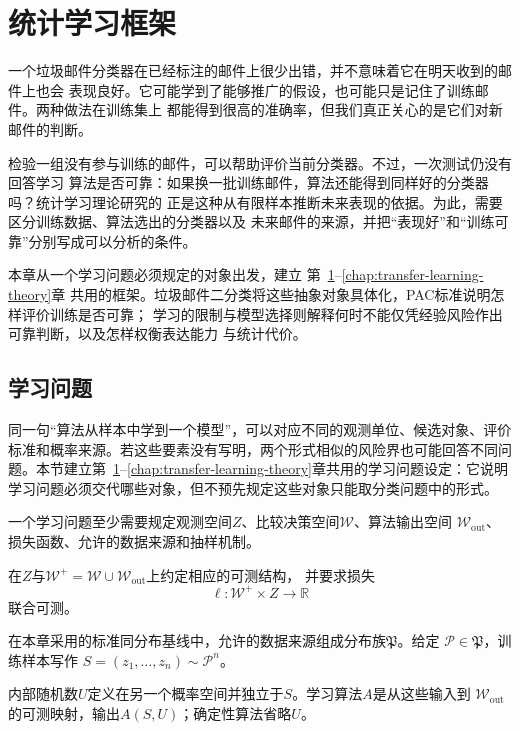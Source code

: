 \chapter{统计学习框架}
\label{chap:statistical-learning-framework}

一个垃圾邮件分类器在已经标注的邮件上很少出错，并不意味着它在明天收到的邮件上也会
表现良好。它可能学到了能够推广的假设，也可能只是记住了训练邮件。两种做法在训练集上
都能得到很高的准确率，但我们真正关心的是它们对新邮件的判断。

检验一组没有参与训练的邮件，可以帮助评价当前分类器。不过，一次测试仍没有回答学习
算法是否可靠：如果换一批训练邮件，算法还能得到同样好的分类器吗？统计学习理论研究的
正是这种从有限样本推断未来表现的依据。为此，需要区分训练数据、算法选出的分类器以及
未来邮件的来源，并把“表现好”和“训练可靠”分别写成可以分析的条件。

本章从一个学习问题必须规定的对象出发，建立
第~\ref{chap:statistical-learning-framework}--\ref{chap:transfer-learning-theory}章
共用的框架。垃圾邮件二分类将这些抽象对象具体化，PAC标准说明怎样评价训练是否可靠；
学习的限制与模型选择则解释何时不能仅凭经验风险作出可靠判断，以及怎样权衡表达能力
与统计代价。

\section{学习问题}
\label{sec:learning-problem}

同一句“算法从样本中学到一个模型”，可以对应不同的观测单位、候选对象、评价标准和概率来源。若这些要素没有写明，两个形式相似的风险界也可能回答不同问题。本节建立第~\ref{chap:statistical-learning-framework}--\ref{chap:transfer-learning-theory}章共用的学习问题设定：它说明学习问题必须交代哪些对象，但不预先规定这些对象只能取分类问题中的形式。

\begin{definition}[学习问题的形式设定]
\label{def:learning-problem-setting}
一个学习问题至少需要规定观测空间$Z$、比较决策空间$\mathcal W$、算法输出空间
$\mathcal W_{\mathrm{out}}$、损失函数、允许的数据来源和抽样机制。

在$Z$与$\mathcal W^+=\mathcal W\cup\mathcal W_{\mathrm{out}}$上约定相应的可测结构，
并要求损失
\[
 \ell:\mathcal W^+\times Z\to\mathbb R
\]
联合可测。

在本章采用的标准同分布基线中，允许的数据来源组成分布族$\mathfrak P$。给定
$\mathcal P\in\mathfrak P$，训练样本写作
$S=(z_1,\ldots,z_n)\sim\mathcal P^n$。

内部随机数$U$定义在另一个概率空间并独立于$S$。学习算法$A$是从这些输入到
$\mathcal W_{\mathrm{out}}$的可测映射，输出$A(S,U)$；确定性算法省略$U$。
\end{definition}

